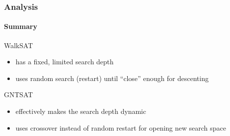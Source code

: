 \begin{frame}
\frametitle{Analysis}
\framesubtitle{Summary}

\begin{alertblock}{WalkSAT}
	\begin{itemize}
		\item has a fixed, limited search depth
		\item uses random search (restart) until ``close'' enough for descenting
	\end{itemize}
\end{alertblock}

\begin{alertblock}{GNTSAT}
	\begin{itemize}
		\item effectively makes the search depth dynamic
		\item uses crossover instead of random restart for opening new search space
	\end{itemize}
\end{alertblock}

\end{frame}
